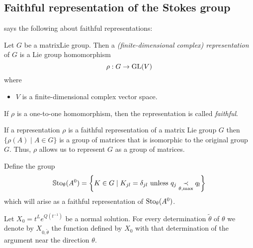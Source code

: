 \subsection{Faithful representation of the Stokes group}
\begin{comment}
  See \cite[9f]{thboalch} and \cite[??]{Loday1994}
\end{comment}
\cite[Def.4.1]{hall2003lie} says the following about faithful representations:
\begin{defn}
  \begin{comment}
    See:
    \begin{itemize}
      \item \cite[Def.4.1]{hall2003lie}
      \item \url{http://nlab.mathforge.org/nlab/show/faithful+representation}
    \end{itemize}
  \end{comment}
  Let $G$ be a matrix\TODO[??] Lie group. Then a \emph{(finite-dimensional
  complex) representation} of $G$ is a Lie group homomorphism
  \[
    \rho:G\to\operatorname{GL}(V)
  \]
  where
  \begin{itemize}
    \item $V$ is a finite-dimensional complex vector space.
  \end{itemize}
  If $\rho$ is a one-to-one homomorphism, then the representation is called
  \emph{faithful}.
  \begin{comment}
    \textbf{Other criterion:}
    If the associated homomorphism $G\to\Aut(V)$ is injective, then the
    representation is \emph{faithful}.
  \end{comment}
  \begin{s-rem}
    If a representation $\rho$ is a faithful representation of a matrix Lie
    group $G$ then $\{\rho(A)\mid A\in G\}$ is a group of matrices that is
    isomorphic to the original group $G$. Thus, $\rho$ allows us to represent
    $G$ as a group of matrices.
  \end{s-rem}
\end{defn}
\begin{defn}
  Define the group
  \[
    \operatorname{\mathbb{S}to}_\theta(A^0)= \left\{K\in G\mid K_{jl}=\delta_{jl} \text{ unless }
      q_j \underset{\theta,\max}{\prec} q_l \right\}
  \]
  which will arise as a faithful representation of $\operatorname{Sto}_\theta(A^0)$.
\end{defn}
Let $X_0=t^L e^{Q(t^{-1})}$ be a normal solution.
For every determination $\tilde\theta$ of $\theta$ we denote by
$X_{0,\tilde\theta}$ the function defined by $X_0$ with that determination of
the argument near the direction $\theta$.

